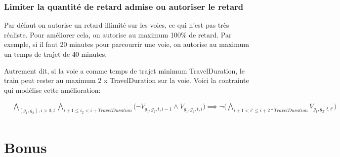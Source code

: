 \documentclass[a4paper]{article}
\begin{document}
\subsubsection{Limiter la quantité de retard admise ou autoriser le retard}

Par défaut on autorise un retard illimité sur les voies, ce qui n'est pas très réaliste. Pour améliorer cela, on autorise au maximum 100\% de retard. Par exemple, si il faut 20 minutes pour parcourrir une voie, on autorise au maximum un temps de trajet de 40 minutes.

Autrement dit, si la voie a comme temps de trajet minimum TravelDuration, le train peut rester au maximum 2 x TravelDuration sur la voie. Voici la contrainte qui modélise cette amélioration: 

\begin{equation*}
    \begin{split}
      & \bigwedge_{(g_1, g_2), i > 0, t} 
        \bigwedge_{i+1\leq i_2<i+TravelDuration} 
        \big( \neg V_{g_1, g_2, t, i-1} \land  V_{g_1, g_2, t, i}\big)
        \implies   
        \neg \big( 
        \bigwedge_{i + 1 < i' \leq i + 2 * TravelDuration} 
        V_{g_1, g_2, t, i'} \big) \\
    \end{split}
    \end{equation*}



\section{Bonus}
\end{document}
